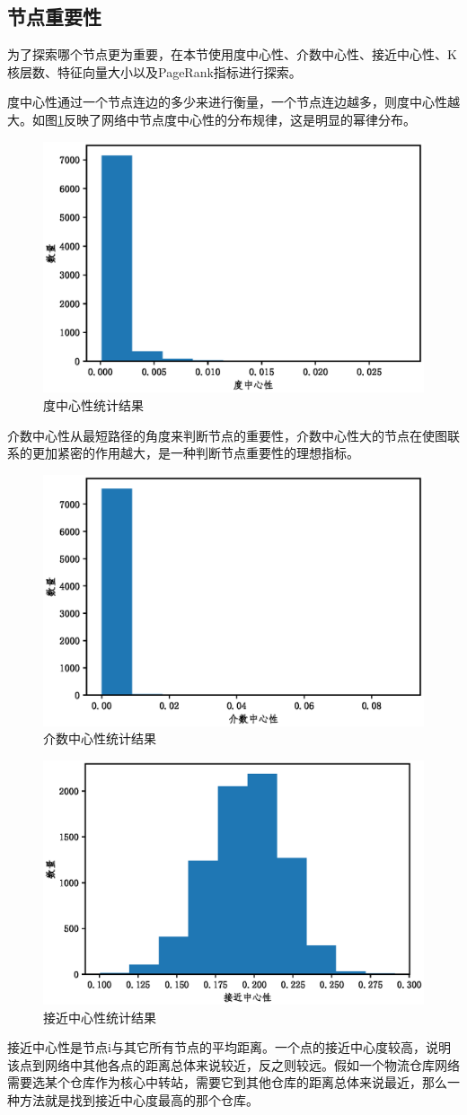 \documentclass[10pt, a4paper]{article}
\begin{document}
\subsection{节点重要性}

为了探索哪个节点更为重要，在本节使用度中心性、介数中心性、接近中心性、K核层数、特征向量大小以及PageRank指标进行探索。

度中心性通过一个节点连边的多少来进行衡量，一个节点连边越多，则度中心性越大。如图\ref{fig:度中心性}反映了网络中节点度中心性的分布规律，这是明显的幂律分布。

\begin{figure}[tbph!]
	\centering
	\includegraphics[width=0.5\linewidth]{figures/度中心性}
	\caption{度中心性统计结果}
	\label{fig:度中心性}
\end{figure}

介数中心性从最短路径的角度来判断节点的重要性，介数中心性大的节点在使图联系的更加紧密的作用越大，是一种判断节点重要性的理想指标。

\begin{figure}[tbph!]
	\centering
	\includegraphics[width=0.5\linewidth]{figures/介数中心性}
	\caption{介数中心性统计结果}
	\label{fig:介数中心性}
\end{figure}
\begin{figure}[tbph!]
	\centering
	\includegraphics[width=0.5\linewidth]{figures/接近中心性}
	\caption{接近中心性统计结果}
	\label{fig:接近中心性}
\end{figure}
接近中心性是节点i与其它所有节点的平均距离。一个点的接近中心度较高，说明该点到网络中其他各点的距离总体来说较近，反之则较远。假如一个物流仓库网络需要选某个仓库作为核心中转站，需要它到其他仓库的距离总体来说最近，那么一种方法就是找到接近中心度最高的那个仓库。
\end{document}
